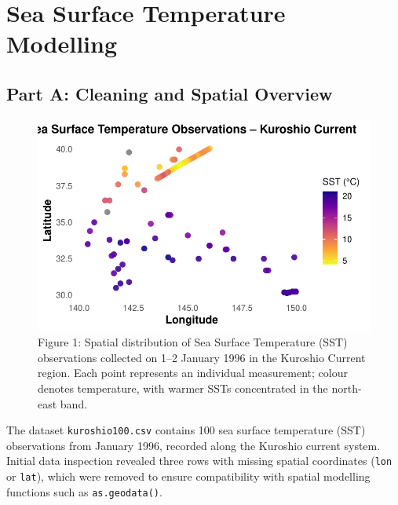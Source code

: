 \documentclass[
  11pt,
]{article}
\renewcommand*\contentsname{Table of contents}
\newcommand\contentsname{Table of contents}
\begin{document}
\renewcommand*\contentsname{Table of contents}
{
\hypersetup{linkcolor=}
\setcounter{tocdepth}{3}
\tableofcontents
}

\newpage

\section{Sea Surface Temperature
Modelling}\label{sea-surface-temperature-modelling}

\subsection{Part A: Cleaning and Spatial
Overview}\label{part-a-cleaning-and-spatial-overview}

\begin{figure}[H]

{\centering \includegraphics{project_files/figure-pdf/fig-scatterplot-1.pdf}

}

\caption{Figure 1: Spatial distribution of Sea Surface Temperature (SST)
observations collected on 1--2 January 1996 in the Kuroshio Current
region. Each point represents an individual measurement; colour denotes
temperature, with warmer SSTs concentrated in the north-east band.}

\end{figure}%

The dataset \texttt{kuroshio100.csv} contains 100 sea surface
temperature (SST) observations from January 1996, recorded along the
Kuroshio current system. Initial data inspection revealed three rows
with missing spatial coordinates (\texttt{lon} or \texttt{lat}), which
were removed to ensure compatibility with spatial modelling functions
such as \texttt{as.geodata()}.
\end{document}
